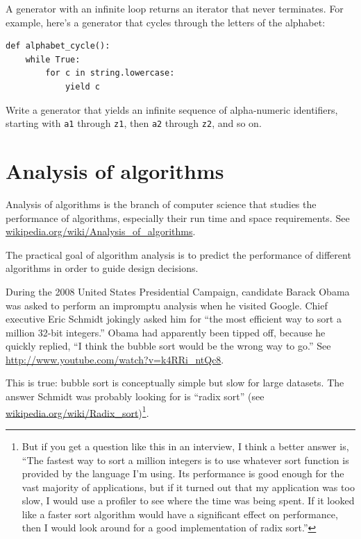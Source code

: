 \documentclass[10pt]{book}
\begin{document}
A generator with an infinite loop returns an iterator that
never terminates.  For example, here's a generator that
cycles through the letters of the alphabet:

\begin{verbatim}
def alphabet_cycle():
    while True:
        for c in string.lowercase:
            yield c
\end{verbatim}


\begin{exercise}

Write a generator that yields an infinite sequence of alpha-numeric
identifiers, starting with {\tt a1} through {\tt z1}, then {\tt a2}
through {\tt z2}, and so on.

\end{exercise}


\chapter{Analysis of algorithms}

Analysis of algorithms is the branch of computer science that studies
the performance of algorithms, especially their run time and space
requirements.  See \url{wikipedia.org/wiki/Analysis_of_algorithms}.


The practical goal of algorithm analysis is to predict the performance
of different algorithms in order to guide design decisions.

During the 2008 United States Presidential Campaign, candidate
Barack Obama was asked to perform an impromptu analysis when
he visited Google.  Chief executive Eric Schmidt jokingly asked him
for ``the most efficient way to sort a million 32-bit integers.''
Obama had apparently been tipped off, because he quickly
replied, ``I think the bubble sort would be the wrong way to go.''
See \url{http://www.youtube.com/watch?v=k4RRi_ntQc8}.

This is true: bubble sort is conceptually simple but slow for
large datasets.  The answer Schmidt was probably looking for is
``radix sort'' (see \url{wikipedia.org/wiki/Radix_sort})\footnote{
But if you get a question like this in an interview, I think
a better answer is, ``The fastest way to sort a million integers
is to use whatever sort function is provided by the language
I'm using.  Its performance is good enough for the vast majority
of applications, but if it turned out that my application was too
slow, I would use a profiler to see where the time was being
spent.  If it looked like a faster sort algorithm would have
a significant effect on performance, then I would look
around for a good implementation of radix sort.''}.
\end{document}
